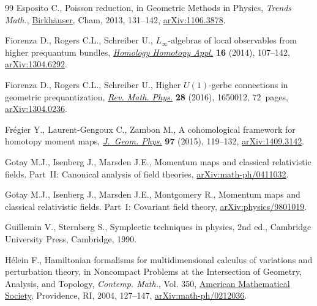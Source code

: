 \begin{thebibliography}{99}
Esposito C., Poisson reduction, in Geometric Methods in Physics, \textit{Trends Math.},
  \href{https://doi.org/10.1007/978-3-319-06248-8_11}{Birkh\"auser}, Cham, 2013, 131--142, \href{https://arxiv.org/abs/1106.3878}{arXiv:1106.3878}.

Fiorenza D., Rogers C.L., Schreiber U., {$L_\infty$}-algebras of local
  observables from higher prequantum bundles, \href{https://doi.org/10.4310/HHA.2014.v16.n2.a6}{\textit{Homology Homotopy Appl.}}
  \textbf{16} (2014), 107--142, \href{https://arxiv.org/abs/1304.6292}{arXiv:1304.6292}.

Fiorenza D., Rogers C.L., Schreiber U., Higher {$U(1)$}-gerbe connections in
  geometric prequantization, \href{https://doi.org/10.1142/S0129055X16500124}{\textit{Rev. Math. Phys.}} \textbf{28} (2016),
  1650012, 72~pages, \href{https://arxiv.org/abs/1304.0236}{arXiv:1304.0236}.

Fr\'egier Y., Laurent-Gengoux C., Zambon M., A cohomological framework for
  homotopy moment maps, \href{https://doi.org/10.1016/j.geomphys.2015.07.010}{\textit{J.~Geom. Phys.}} \textbf{97} (2015), 119--132,
  \href{https://arxiv.org/abs/1409.3142}{arXiv:1409.3142}.

Gotay M.J., Isenberg J., Marsden J.E., Momentum maps and classical relativistic
  fields. Part~{II}: {C}anonical analysis of field theories,
  \href{https://arxiv.org/abs/math-ph/0411032}{arXiv:math-ph/0411032}.

Gotay M.J., Isenberg J., Marsden J.E., Montgomery R., Momentum maps and
  classical relativistic fields. {P}art~{I}: {C}ovariant field theory,
  \href{https://arxiv.org/abs/physics/9801019}{arXiv:physics/9801019}.

Guillemin V., Sternberg S., Symplectic techniques in physics, 2nd ed.,
  Cambridge University Press, Cambridge, 1990.

H\'elein F., Hamiltonian formalisms for multidimensional calculus of variations
  and perturbation theory, in Noncompact Problems at the Intersection of
  Geometry, Analysis, and Topology, \textit{Contemp. Math.}, Vol. 350, \href{https://doi.org/10.1090/conm/350/06342}{American
  Mathematical Society}, Providence, RI, 2004, 127--147,
  \href{https://arxiv.org/abs/math-ph/0212036}{arXiv:math-ph/0212036}.


\end{thebibliography}

